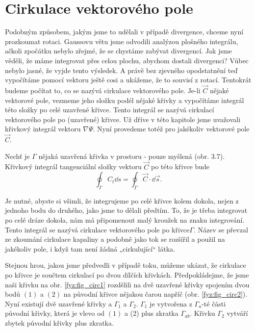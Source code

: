   \section{Cirkulace vektorového pole}
    Podobným způsobem, jakým jsme to udělali v případě divergence, chceme nyní prozkoumat rotaci. 
    Gaussovu větu jsme odvodili analýzou plošného integrálu, ačkoli zpočátku nebylo zřejmé, že se 
    chystáme zabývat divergencí. Jak jsme věděli, že máme integrovat přes celou plochu, abychom 
    dostali divergenci? Vůbec nebylo jasné, že vyjde tento výsledek. A právě bez zjevného  
    opodstatnění teď vypočítáme pomocí vektoru ještě cosi a ukážeme, že to souvisí z rotací. 
    Tentokrát budeme počítat to, co se nazývá cirkulace vektorového pole. Je-li \(\vec{C}\) nějaké 
    vektorové pole, vezmeme jeho složku podél nějaké křivky a vypočítáme integrál této složky po 
    celé uzavřené křivce. Tento integrál se nazývá cirkulací vektorového pole po (uzavřené) křivce. 
    Už dříve v této kapitole jsme uvažovali křivkový integrál vektoru \(\nabla\Psi\). Nyní provedeme 
    totéž pro jakékoliv vektorové pole \(\vec{C}\).
    
    Nechť je \(\Gamma\) nějaká uzavřená křivka v prostoru - pouze myšlená (obr. 3.7). Křivkový
    integrál tangenciální složky vektoru \(\vec{C}\) po této křivce bude
    \begin{equation}\label{fyz:eq_fey_circ1}
     \oint_\Gamma C_t\dd{s} = \oint_\Gamma\vec{C}\cdot\dd{\vec{s}}.
    \end{equation}    
    
    Je nutné, abyste si všimli, že integrujeme po celé křivce kolem dokola, nejen z jednoho bodu do 
    druhého, jako jsme to dělali předtím. To, že je třeba integrovat po celé dráze dokola, nám má 
    připomenout malý kroužek na znaku integrování. Tento integrál se nazývá cirkulace vektorového 
    pole po křivce\(\Gamma\). Název se převzal ze zkoumání cirkulace kapaliny a podobně jako tok se 
    rozšířil a použil na jakékoliv pole, i když tam není žádná „cirkulující“ látka.
    
    Stejnou hrou, jakou jsme předvedli v případě toku, můžeme ukázat, že cirkulace po křivce je 
    součtem cirkulací po dvou dílčích křivkách. Předpokládejme, že jsme naši křivku na obr. 
    \ref{fyz:fig_circ1} rozdělili na dvě uzavřené křivky spojením dvou bodů \((1)\) a \((2)\) na 
    původní křivce nějakou čarou napříč (obr. \ref{fyz:fig_circ2}). Nyní existují dvě uzavřené 
    křivky  a \(\Gamma_1\) a \(\Gamma_2\). \(\Gamma_1\) je vytvořena z \(\Gamma_a\)-té části původní 
    křivky, která je vlevo od \((1)\) a (2) plus zkratka \(\Gamma_{ab}\). Křivku \(\Gamma_2\) 
    vytváří zbytek původní křivky plus zkratka.
    
